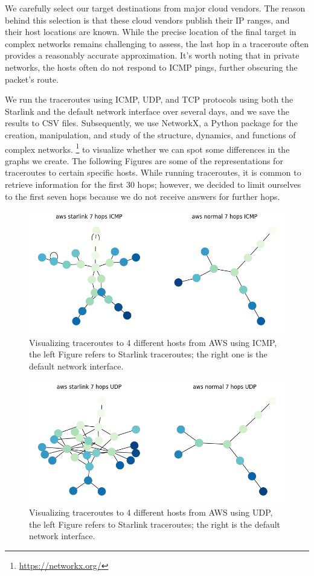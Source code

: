 \documentclass[IN,11pt,twoside,openright,idp,english]{tumthesis}
\begin{document}
We carefully select our target destinations from major cloud vendors. The reason behind this selection is that these cloud vendors publish their IP ranges, and their host locations are known. While the precise location of the final target in complex networks remains challenging to assess, the last hop in a traceroute often provides a reasonably accurate approximation. It's worth noting that in private networks, the hosts often do not respond to ICMP pings, further obscuring the packet's route.

We run the traceroutes using ICMP, UDP, and TCP protocols using both the Starlink and the default network interface over several days, and we save the results to CSV files. Subsequently, we use NetworkX, a Python package for the creation, manipulation, and study of the structure, dynamics, and functions of complex networks. \footnote{\url{https://networkx.org/}} to visualize whether we can spot some differences in the graphs we create. The following Figures are some of the representations for traceroutes to certain specific hosts. While running traceroutes, it is common to retrieve information for the first 30 hops; however, we decided to limit ourselves to the first seven hops because we do not receive answers for further hops. 

\begin{figure}
    \label{fig:tr_aws_icmp}
    \centering
    \includegraphics[width=0.6\columnwidth]{img/tr_aws_icmp.png}
    \caption{Visualizing traceroutes to 4 different hosts from AWS using ICMP, the left Figure refers to Starlink traceroutes; the right one is the default network interface.}
\end{figure}
    
\begin{figure}
    \label{fig:tr_aws_udp}
    \centering
    \includegraphics[width=0.6\columnwidth]{img/tr_aws_udp.png}
    \caption{Visualizing traceroutes to 4 different hosts from AWS using UDP, the left Figure refers to Starlink traceroutes; the right is the default network interface.}
\end{figure}
    
\end{document}

